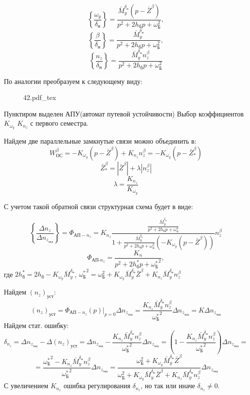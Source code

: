 \documentclass{article}
\begin{document}
\[
	\left\{\frac{\omega_y}{\delta_\text{н}}\right\} =
	\frac{\bar{M}_y^{\delta_\text{н}}(p - \bar{Z}^\beta)}{ p^2 + 2 h_\text{б}p
	+ \omega_\text{Б}^2 },
\]
\[
	\left\{ \frac{\beta}{\delta_\text{н}} \right\} = \frac{
	\bar{M}_y^{\delta_\text{н}} }{ p^2 + 2 h_\text{б}p + \omega_\text{Б}^2 }
	,\]
\[
	\left\{ \frac{n_z}{\delta_\text{н}} \right\} = \frac{
	\bar{M}_y^{\delta_\text{н}} n_z^\beta }{ p^2 + 2 h_\text{б}p +
	\omega_\text{Б}^2 }
\]

По аналогии преобразуем к следующему виду:

\begin{figure}[H]
	\centering
	{42.pdf_tex}
\end{figure}


Пунктиром выделен АПУ(автомат путевой устойчивости)
Выбор коэффициентов $K_{\omega_y}$ $K_{n_z}$ с первого семестра.

Найдем две параллельные замкнутые связи можно объединить в:
\[
	W_\text{ОС}^\beta = - K_{\omega_y} (p - \bar{Z}^\beta) + K_{n_z} n_z^\beta
	= - K_{\omega_y}(p - \bar{Z}_*^\beta)
\]
\[
	\bar{Z}_*^\beta = |\bar{Z}^\beta| + \lambda |n_z^\beta|
\]
\[
	\lambda = \frac{K_{n_z}}{K_{\omega_y}}
\]

С учетом такой обратной связи структурная схема будет в виде:

\begin{figure}[ht]
	\centering
	\label{fig:fig_49}
\end{figure}

\[
	\left\{\frac{\Delta n_z}{\Delta n_{z_\text{зад}}} \right\}  =
	\Phi_{\text{АП}-n_z} = K_{n_z}\frac{\frac{\bar{M}_y^{\delta_\text{н}}}{p^2
	+ 2 h_\text{б} p + \omega_\text{б}^2}}{1
	+\frac{\bar{M}_y^{\delta_\text{н}}}{p^2 + 2 h_\text{б} p + \omega_\text{б}^2}
	(-K_{\omega_y}(p - \bar{Z}^\beta))}n_z^\beta
\]
\[
	\Phi_{\text{АП-}n_z} =\frac{K_n}{ p^2 + 2 h_\text{б}^*p +
	{\omega_\text{Б}^*}^2  },
\]
где $2h_\text{б}^* = 2h_\text{б} - K_{\omega_y}\bar{M}_y^{\delta_\text{н}}$,
${\omega_\text{Б}^*}^2 = \omega_\text{Б}^2 +
	K_{\omega_y}\bar{M}_y^{\delta_\text{н}} \bar{Z}^\beta + K_{n_z}
	\bar{M}_y^{\delta_\text{н}} n_z^\beta $

Найдем $(n_z)_\text{уст}$:
\[
	(n_z)_\text{уст} = \Phi_{\text{АП}-n_z}(p) |_{p=0} \Delta n_{z_\text{зад}}
	=\frac{K_{n_z} \bar{M}_y^{\delta_\text{н}}
	n_z^\beta}{{\omega_\text{Б}^*}^2} \Delta n_{z_\text{зад}} = K \Delta
	n_{z_\text{зад}}
\]
Найдем стат. ошибку:
\[
	\delta_{n_z} = \Delta n_{z_\text{зад}} - \Delta (n_z)_\text{уст} = \Delta
	n_{z_\text{зад}} - \frac{K_{n_z}
	\bar{M}_y^{\delta_\text{н}}n_z^\beta}{{\omega_\text{Б}^*}^2} \Delta
	n_{z_\text{зад}} = \left( 1 - \frac{ K_{n_z} \bar{M}_y^{\delta_\text{н}}
		n_z^\beta}{{\omega_\text{Б}^*}^2} \right) \Delta n_{z_\text{зад}} =
\]
\[
	= \frac{{\omega_\text{Б}^*}^2 - K_{n_z} \bar{M}_y^{\delta_\text{н}}
	n_z^\beta}{ {\omega_\text{Б}^*}^2} \Delta n_{z_\text{зад}} =
	\frac{\omega_\text{Б}^2 + K_{\omega_y} \bar{M}_y^{\delta_\text{н}}
	\bar{Z}^\beta}{\omega_\text{Б}^2 + K_{\omega_y} \bar{M}_y^{\delta_\text{н}}
	\bar{Z}^\beta + K_{n_z} \bar{M}_y^{\delta_\text{н}} n_z^\beta} \Delta
	n_{z_\text{зад}}
\]
С увеличением $K_{n_z}$ ошибка регулирования $\delta_{n_z}$, но так или иначе
$\delta_{n_z} \neq 0$.
\end{document}
